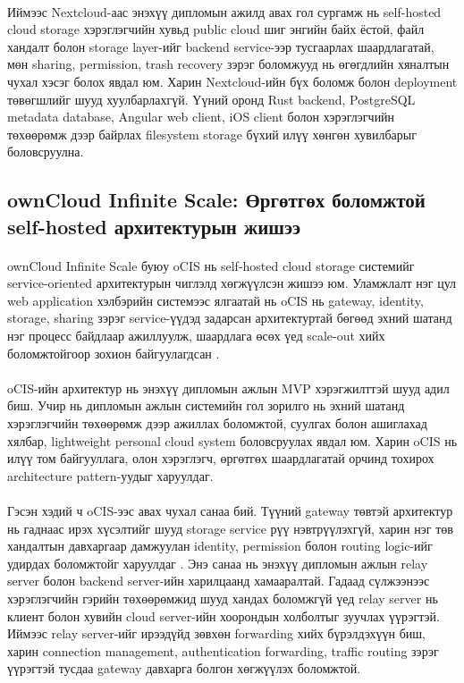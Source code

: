 \paragraph{}
Иймээс Nextcloud-аас энэхүү дипломын ажилд авах гол сургамж нь self-hosted cloud storage хэрэглэгчийн хувьд public cloud шиг энгийн байх ёстой, файл хандалт болон storage layer-ийг backend service-ээр тусгаарлах шаардлагатай, мөн sharing, permission, trash recovery зэрэг боломжууд нь өгөгдлийн хяналтын чухал хэсэг болох явдал юм. Харин Nextcloud-ийн бүх боломж болон deployment төвөгшлийг шууд хуулбарлахгүй. Үүний оронд Rust backend, PostgreSQL metadata database, Angular web client, iOS client болон хэрэглэгчийн төхөөрөмж дээр байрлах filesystem storage бүхий илүү хөнгөн хувилбарыг боловсруулна.

\subsection{ownCloud Infinite Scale: Өргөтгөх боломжтой self-hosted архитектурын жишээ}

\paragraph{}
ownCloud Infinite Scale буюу oCIS нь self-hosted cloud storage системийг service-oriented архитектурын чиглэлд хөгжүүлсэн жишээ юм. Уламжлалт нэг цул web application хэлбэрийн системээс ялгаатай нь oCIS нь gateway, identity, storage, sharing зэрэг service-үүдэд задарсан архитектуртай бөгөөд эхний шатанд нэг процесс байдлаар ажиллуулж, шаардлага өсөх үед scale-out хийх боломжтойгоор зохион байгуулагдсан \cite{owncloud-infinite-scale-release,owncloud-ocis-architecture}.

\paragraph{}
oCIS-ийн архитектур нь энэхүү дипломын ажлын MVP хэрэгжилттэй шууд адил биш. Учир нь дипломын ажлын системийн гол зорилго нь эхний шатанд хэрэглэгчийн төхөөрөмж дээр ажиллах боломжтой, суулгах болон ашиглахад хялбар, lightweight personal cloud system боловсруулах явдал юм. Харин oCIS нь илүү том байгууллага, олон хэрэглэгч, өргөтгөх шаардлагатай орчинд тохирох architecture pattern-уудыг харуулдаг.

\paragraph{}
Гэсэн хэдий ч oCIS-ээс авах чухал санаа бий. Түүний gateway төвтэй архитектур нь гаднаас ирэх хүсэлтийг шууд storage service рүү нэвтрүүлэхгүй, харин нэг төв хандалтын давхаргаар дамжуулан identity, permission болон routing logic-ийг удирдах боломжтойг харуулдаг \cite{owncloud-ocis-security}. Энэ санаа нь энэхүү дипломын ажлын relay server болон backend server-ийн харилцаанд хамааралтай. Гадаад сүлжээнээс хэрэглэгчийн гэрийн төхөөрөмжид шууд хандах боломжгүй үед relay server нь клиент болон хувийн cloud server-ийн хоорондын холболтыг зуучлах үүрэгтэй. Иймээс relay server-ийг ирээдүйд зөвхөн forwarding хийх бүрэлдэхүүн биш, харин connection management, authentication forwarding, traffic routing зэрэг үүрэгтэй тусдаа gateway давхарга болгон хөгжүүлэх боломжтой.

